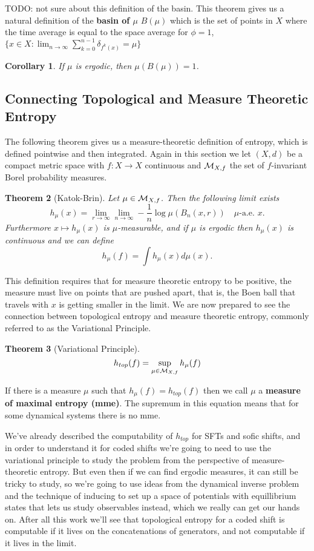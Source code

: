 \documentclass[11pt, reqno]{amsart}
\theoremstyle{plain}
\newtheorem{thm}{Theorem}[section]
\newtheorem{cor}[thm]{Corollary}
\theoremstyle{definition}
\begin{document}
TODO: not sure about this definition of the basin. This theorem gives us a natural definition of the \textbf{basin of $\mu$} $B(\mu)$ which is the set of points in $X$ where the time average is equal to the space average for $\phi = 1$, $\{x \in X : \lim_{n\rightarrow \infty} \sum_{k=0}^{n-1}\delta_{f^k(x)} = \mu\}$
\begin{cor}
  If $\mu$ is ergodic, then $\mu(B(\mu)) = 1$.
\end{cor}

\subsection{Connecting Topological and Measure Theoretic Entropy}\cite[L10, L11]{wolf}
The following theorem gives us a measure-theoretic definition of entropy, which is defined pointwise and then integrated. Again in this section we let $(X,d)$ be a compact metric space with $f: X \rightarrow X$ continuous and $\mathcal{M}_{X,f}$ the set of $f$-invariant Borel probability measures. 
\begin{thm}[Katok-Brin]
  Let $\mu \in \mathcal{M}_{X,f}$. Then the following limit exists 
  $$h_\mu(x) = \lim_{r \rightarrow \infty} \lim_{n \rightarrow \infty} - \frac{1}{n} \log \mu(B_n(x, r)) \quad \mu\text{-a.e. } x.$$
  Furthermore $x \mapsto h_\mu(x)$ is $\mu$-measurable, and if $\mu$ is ergodic then $h_\mu(x)$ is continuous and we can define 
  $$h_\mu(f) = \int h_\mu(x)d\mu(x).$$
\end{thm}
This definition requires that for measure theoretic entropy to be positive, the measure must live on points that are pushed apart, that is, the Boen ball that travels with $x$ is getting smaller in the limit. We are now prepared to see the connection between topological entropy and measure theoretic entropy, commonly referred to as the Variational Principle.

\begin{thm}[Variational Principle]
  $$h_{top}(f)= \sup_{\mu \in \mathcal{M}_{X,f}}h_\mu(f)$$
\end{thm}

If there is a measure $\mu$ such that $h_\mu(f) = h_{top}(f)$ then we call $\mu$ a \textbf{measure of maximal entropy (mme)}. The supremum in this equation means that for some dynamical systems there is no mme. 

We've already described the computability of $h_{top}$ for SFTs and sofic shifts, and in order to understand it for coded shifts we're going to need to use the variational principle to study the problem from the perspective of measure-theoretic entropy. But even then if we can find ergodic measures, it can still be tricky to study, so we're going to use ideas from the dynamical inverse problem and the technique of inducing to set up a space of potentials with equillibrium states that lets us study observables instead, which we really can get our hands on. After all this work we'll see that topological entropy for a coded shift is computable if it lives on the concatenations of generators, and not computable if it lives in the limit.
\end{document}
